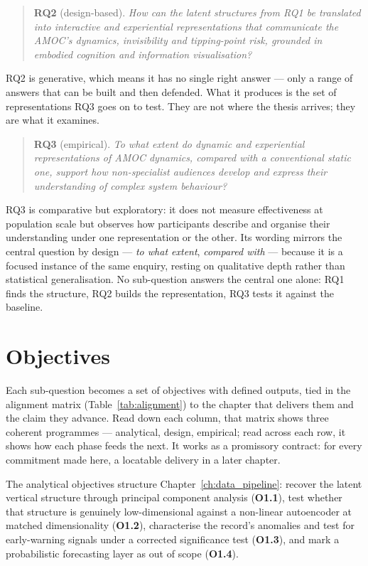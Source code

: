 \begin{quote}
\textbf{RQ2} (design-based). \emph{How can the latent structures from RQ1 be translated into interactive and experiential representations that communicate the AMOC's dynamics, invisibility and tipping-point risk, grounded in embodied cognition and information visualisation?}
\end{quote}

RQ2 is generative, which means it has no single right answer --- only a range of answers that can be built and then defended. What it produces is the set of representations RQ3 goes on to test. They are not where the thesis arrives; they are what it examines.

\begin{quote}
\textbf{RQ3} (empirical). \emph{To what extent do dynamic and experiential representations of AMOC dynamics, compared with a conventional static one, support how non-specialist audiences develop and express their understanding of complex system behaviour?}
\end{quote}

RQ3 is comparative but exploratory: it does not measure effectiveness at population scale but observes how participants describe and organise their understanding under one representation or the other. Its wording mirrors the central question by design --- \emph{to what extent}, \emph{compared with} --- because it is a focused instance of the same enquiry, resting on qualitative depth rather than statistical generalisation. No sub-question answers the central one alone: RQ1 finds the structure, RQ2 builds the representation, RQ3 tests it against the baseline.

\section{Objectives}
\label{sec:objectives}

Each sub-question becomes a set of objectives with defined outputs, tied in the alignment matrix (Table~\ref{tab:alignment}) to the chapter that delivers them and the claim they advance. Read down each column, that matrix shows three coherent programmes --- analytical, design, empirical; read across each row, it shows how each phase feeds the next. It works as a promissory contract: for every commitment made here, a locatable delivery in a later chapter.

The analytical objectives structure Chapter~\ref{ch:data_pipeline}: recover the latent vertical structure through principal component analysis (\textbf{O1.1}), test whether that structure is genuinely low-dimensional against a non-linear autoencoder at matched dimensionality (\textbf{O1.2}), characterise the record's anomalies and test for early-warning signals under a corrected significance test (\textbf{O1.3}), and mark a probabilistic forecasting layer as out of scope (\textbf{O1.4}).

